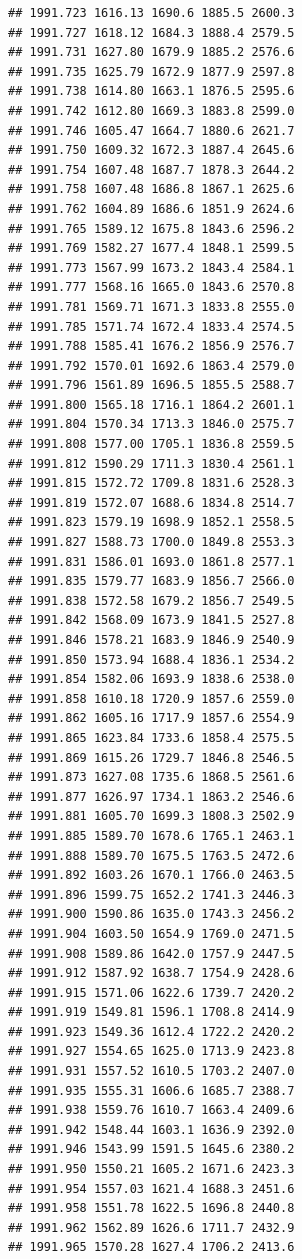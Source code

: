 \documentclass[
]{book}
\begin{document}
\begin{verbatim}
## 1991.723 1616.13 1690.6 1885.5 2600.3
## 1991.727 1618.12 1684.3 1888.4 2579.5
## 1991.731 1627.80 1679.9 1885.2 2576.6
## 1991.735 1625.79 1672.9 1877.9 2597.8
## 1991.738 1614.80 1663.1 1876.5 2595.6
## 1991.742 1612.80 1669.3 1883.8 2599.0
## 1991.746 1605.47 1664.7 1880.6 2621.7
## 1991.750 1609.32 1672.3 1887.4 2645.6
## 1991.754 1607.48 1687.7 1878.3 2644.2
## 1991.758 1607.48 1686.8 1867.1 2625.6
## 1991.762 1604.89 1686.6 1851.9 2624.6
## 1991.765 1589.12 1675.8 1843.6 2596.2
## 1991.769 1582.27 1677.4 1848.1 2599.5
## 1991.773 1567.99 1673.2 1843.4 2584.1
## 1991.777 1568.16 1665.0 1843.6 2570.8
## 1991.781 1569.71 1671.3 1833.8 2555.0
## 1991.785 1571.74 1672.4 1833.4 2574.5
## 1991.788 1585.41 1676.2 1856.9 2576.7
## 1991.792 1570.01 1692.6 1863.4 2579.0
## 1991.796 1561.89 1696.5 1855.5 2588.7
## 1991.800 1565.18 1716.1 1864.2 2601.1
## 1991.804 1570.34 1713.3 1846.0 2575.7
## 1991.808 1577.00 1705.1 1836.8 2559.5
## 1991.812 1590.29 1711.3 1830.4 2561.1
## 1991.815 1572.72 1709.8 1831.6 2528.3
## 1991.819 1572.07 1688.6 1834.8 2514.7
## 1991.823 1579.19 1698.9 1852.1 2558.5
## 1991.827 1588.73 1700.0 1849.8 2553.3
## 1991.831 1586.01 1693.0 1861.8 2577.1
## 1991.835 1579.77 1683.9 1856.7 2566.0
## 1991.838 1572.58 1679.2 1856.7 2549.5
## 1991.842 1568.09 1673.9 1841.5 2527.8
## 1991.846 1578.21 1683.9 1846.9 2540.9
## 1991.850 1573.94 1688.4 1836.1 2534.2
## 1991.854 1582.06 1693.9 1838.6 2538.0
## 1991.858 1610.18 1720.9 1857.6 2559.0
## 1991.862 1605.16 1717.9 1857.6 2554.9
## 1991.865 1623.84 1733.6 1858.4 2575.5
## 1991.869 1615.26 1729.7 1846.8 2546.5
## 1991.873 1627.08 1735.6 1868.5 2561.6
## 1991.877 1626.97 1734.1 1863.2 2546.6
## 1991.881 1605.70 1699.3 1808.3 2502.9
## 1991.885 1589.70 1678.6 1765.1 2463.1
## 1991.888 1589.70 1675.5 1763.5 2472.6
## 1991.892 1603.26 1670.1 1766.0 2463.5
## 1991.896 1599.75 1652.2 1741.3 2446.3
## 1991.900 1590.86 1635.0 1743.3 2456.2
## 1991.904 1603.50 1654.9 1769.0 2471.5
## 1991.908 1589.86 1642.0 1757.9 2447.5
## 1991.912 1587.92 1638.7 1754.9 2428.6
## 1991.915 1571.06 1622.6 1739.7 2420.2
## 1991.919 1549.81 1596.1 1708.8 2414.9
## 1991.923 1549.36 1612.4 1722.2 2420.2
## 1991.927 1554.65 1625.0 1713.9 2423.8
## 1991.931 1557.52 1610.5 1703.2 2407.0
## 1991.935 1555.31 1606.6 1685.7 2388.7
## 1991.938 1559.76 1610.7 1663.4 2409.6
## 1991.942 1548.44 1603.1 1636.9 2392.0
## 1991.946 1543.99 1591.5 1645.6 2380.2
## 1991.950 1550.21 1605.2 1671.6 2423.3
## 1991.954 1557.03 1621.4 1688.3 2451.6
## 1991.958 1551.78 1622.5 1696.8 2440.8
## 1991.962 1562.89 1626.6 1711.7 2432.9
## 1991.965 1570.28 1627.4 1706.2 2413.6

\end{verbatim}
\end{document}
